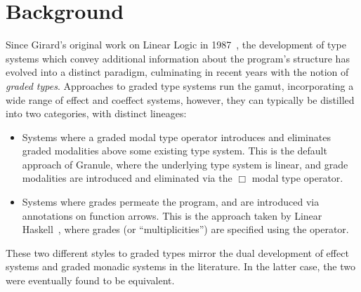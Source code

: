 \chapter{Background}
\label{chapter:background}
Since Girard's original work on Linear Logic in 1987~\cite{girard1987linear},
the development of type systems which convey additional information about the
program's structure has evolved into a distinct paradigm, culminating in recent
years with the notion of \textit{graded types}. Approaches to graded type
systems run the gamut, incorporating a wide range of effect and coeffect
systems, however, they can typically be distilled into two categories, with
distinct lineages: 
\begin{itemize}
  \item Systems where a graded modal type operator introduces and eliminates
        graded modalities above some existing type system. This is the default
        approach of Granule, where the underlying type system is linear, and
        grade modalities are introduced and eliminated via the $\Box$ modal type
        operator.
  \item Systems where grades permeate the program, and are introduced via
        annotations on function arrows. This is the approach taken by Linear
        Haskell~\cite{DBLP:journals/pacmpl/BernardyBNJS18}, where grades (or
        ``multiplicities'') are specified using the \granin{\%} operator. 
\end{itemize}  
These two different styles to graded types mirror the dual development of effect
systems and graded monadic systems in the literature. In the latter case, the
two were eventually found to be equivalent. 






